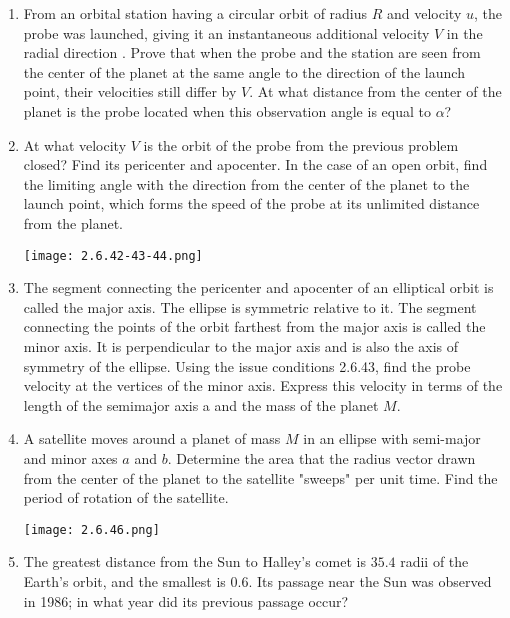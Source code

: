 \documentclass{article}
\begin{document}
\begin{enumerate}[label=2.6.\arabic*]
\item From an orbital station having a circular orbit of radius $R$ and velocity $u$, the probe was launched, giving it an instantaneous additional velocity $V$ in the radial direction . Prove that when the probe and the station are seen from the center of the planet at the same angle to the direction of the launch point, their velocities still differ by $V$. At what distance from the center of the planet is the probe located when this observation angle is equal to $\alpha$?

\item At what velocity $V$ is the orbit of the probe from the previous problem closed? Find its pericenter and apocenter. In the case of an open orbit, find the limiting angle with the direction from the center of the planet to the launch point, which forms the speed of the probe at its unlimited distance from the planet.

\begin{center}
    \texttt{[image: 2.6.42-43-44.png]}
\end{center}

\item The segment connecting the pericenter and apocenter of an elliptical orbit is called the major axis. The ellipse is symmetric relative to it. The segment connecting the points of the orbit farthest from the major axis is called the minor axis. It is perpendicular to the major axis and is also the axis of symmetry of the ellipse. Using the issue conditions 2.6.43, find the probe velocity at the vertices of the minor axis. Express this velocity in terms of the length of the semimajor axis a and the mass of the planet $M$.

\item A satellite moves around a planet of mass $M$ in an ellipse with semi-major and minor axes $a$ and $b$. Determine the area that the radius vector drawn from the center of the planet to the satellite "sweeps" per unit time. Find the period of rotation of the satellite.

\begin{center}
    \texttt{[image: 2.6.46.png]}
\end{center}

\item The greatest distance from the Sun to Halley's comet is $35.4$ radii of the Earth's orbit, and the smallest is $0.6$. Its passage near the Sun was observed in 1986; in what year did its previous passage occur?


\end{enumerate}
\end{document}
